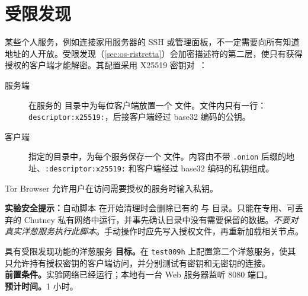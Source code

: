 \section{受限发现}\label{sec:onionp-ristretta}

某些个人服务，例如连接家用服务器的 SSH 或管理面板，不一定需要向所有知道地址的人开放。受限发现（\cref{sec:os-ristretta}）会加密描述符的第二层，使只有获得授权的客户端才能解密。其配置采用 X25519 密钥对~\cite{torspec}：
\begin{description}
  \item[服务端] 在服务的  目录中为每位客户端放置一个  文件。文件内只有一行：\texttt{descriptor:\allowbreak x25519:}，后接客户端经过 base32 编码的公钥。
  \item[客户端]  指定的目录中，为每个服务保存一个  文件。内容由不带 \texttt{.onion} 后缀的地址、\texttt{:\allowbreak descriptor:\allowbreak x25519:} 和客户端经过 base32 编码的私钥组成。
\end{description}
Tor Browser 允许用户在访问需要授权的服务时输入私钥。

\textbf{实验安全提示：}自动脚本  在开始清理时会删除已有的  与  目录。只能在专用、可丢弃的 Chutney 私有网络中运行，并事先确认目录中没有需要保留的数据。\emph{不要对真实洋葱服务执行此脚本}。手动操作时应先写入授权文件，再重新加载相关节点。

\begin{laboratorio}[13]{具有受限发现功能的洋葱服务}
\textbf{目标。}在 \texttt{test009h} 上配置第二个洋葱服务，使其只允许持有授权密钥的客户端访问，并分别测试有密钥和无密钥的连接。\\
\textbf{前置条件。}实验网络已经运行；本地有一台 Web 服务器监听 8080 端口。\\
\textbf{预计时间。}1 小时。
\end{laboratorio}

